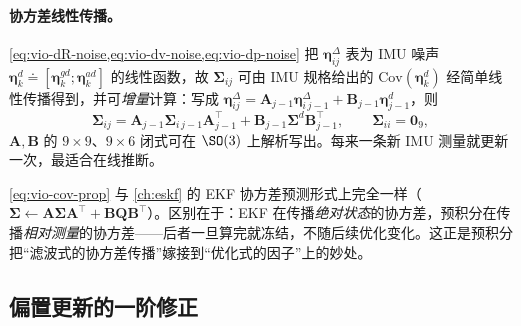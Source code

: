 \paragraph{协方差线性传播。}
\cref{eq:vio-dR-noise,eq:vio-dv-noise,eq:vio-dp-noise} 把 $\boldsymbol{\eta}^\Delta_{ij}$ 表为 IMU 噪声 $\boldsymbol{\eta}^d_k\doteq[\boldsymbol{\eta}^{gd}_k;\boldsymbol{\eta}^{ad}_k]$ 的线性函数，故 $\boldsymbol{\Sigma}_{ij}$ 可由 IMU 规格给出的 $\mathrm{Cov}(\boldsymbol{\eta}^d_k)$ 经简单线性传播得到，并可\emph{增量}计算：写成 $\boldsymbol{\eta}^\Delta_{ij}=\mathbf{A}_{j-1}\boldsymbol{\eta}^\Delta_{i\,j-1}+\mathbf{B}_{j-1}\boldsymbol{\eta}^d_{j-1}$，则
\begin{equation}
  \boldsymbol{\Sigma}_{ij}=\mathbf{A}_{j-1}\boldsymbol{\Sigma}_{i\,j-1}\mathbf{A}_{j-1}^\top+\mathbf{B}_{j-1}\boldsymbol{\Sigma}^d\mathbf{B}_{j-1}^\top,\qquad \boldsymbol{\Sigma}_{ii}=\mathbf{0}_{9},
  \label{eq:vio-cov-prop}
\end{equation}
$\mathbf{A},\mathbf{B}$ 的 $9\times9$、$9\times6$ 闭式可在 $\SO(3)$ 上解析写出\cite{forster2017preintegration}。每来一条新 IMU 测量就更新一次，最适合在线推断。

\begin{insight}
\cref{eq:vio-cov-prop} 与 \cref{ch:eskf} 的 EKF 协方差预测形式上完全一样（$\boldsymbol{\Sigma}\leftarrow\mathbf{A}\boldsymbol{\Sigma}\mathbf{A}^\top+\mathbf{B}\mathbf{Q}\mathbf{B}^\top$）。区别在于：EKF 在传播\emph{绝对状态}的协方差，预积分在传播\emph{相对测量}的协方差——后者一旦算完就冻结，不随后续优化变化。这正是预积分把“滤波式的协方差传播”嫁接到“优化式的因子”上的妙处。
\end{insight}

\subsection{偏置更新的一阶修正}
\label{sec:vio-bias}

